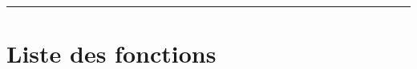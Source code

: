 \documentclass[a4paper,10pt]{article}
\begin{document}
    \setlength{\parskip}{2em}





    \color{sec1}\par\noindent\rule{\textwidth}{0.4pt}\color{text}

    \color{sec1}
    \section{Liste des fonctions}\color{text}
\end{document}
